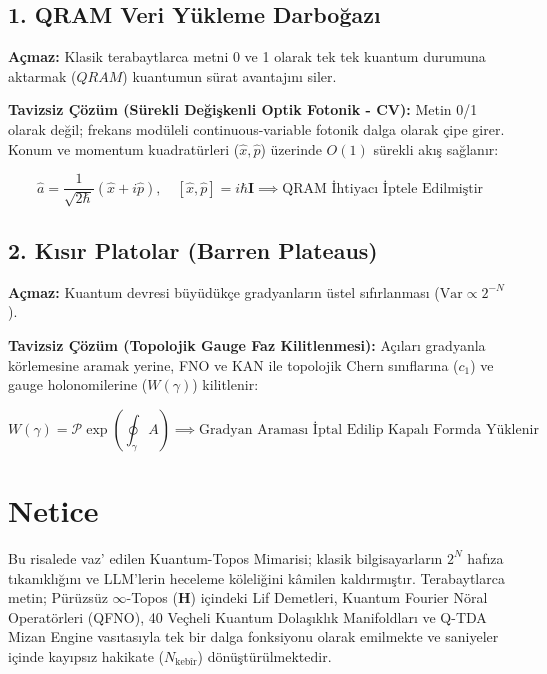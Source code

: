 \documentclass[11pt, a4paper]{article}
\begin{document}
\subsection{1. QRAM Veri Yükleme Darboğazı}
\textbf{Açmaz:} Klasik terabaytlarca metni 0 ve 1 olarak tek tek kuantum durumuna aktarmak ($QRAM$) kuantumun sürat avantajını siler.

\textbf{Tavizsiz Çözüm (Sürekli Değişkenli Optik Fotonik - CV):} Metin 0/1 olarak değil; frekans modüleli continuous-variable fotonik dalga olarak çipe girer. Konum ve momentum kuadratürleri ($\hat{x}, \hat{p}$) üzerinde $O(1)$ sürekli akış sağlanır:

\begin{equation}
\hat{a} = \frac{1}{\sqrt{2\hbar}}(\hat{x} + i\hat{p}), \quad [\hat{x}, \hat{p}] = i\hbar \mathbf{I} \implies \text{QRAM İhtiyacı İptele Edilmiştir}
\end{equation}

\subsection{2. Kısır Platolar (Barren Plateaus)}
\textbf{Açmaz:} Kuantum devresi büyüdükçe gradyanların üstel sıfırlanması ($\text{Var} \propto 2^{-N}$).

\textbf{Tavizsiz Çözüm (Topolojik Gauge Faz Kilitlenmesi):} Açıları gradyanla körlemesine aramak yerine, FNO ve KAN ile topolojik Chern sınıflarına ($c_1$) ve gauge holonomilerine ($W(\gamma)$) kilitlenir:

\begin{equation}
W(\gamma) = \mathcal{P} \exp\left( \oint_\gamma A \right) \implies \text{Gradyan Araması İptal Edilip Kapalı Formda Yüklenir}
\end{equation}

\section{Netice}

Bu risalede vaz' edilen Kuantum-Topos Mimarisi; klasik bilgisayarların $2^N$ hafıza tıkanıklığını ve LLM'lerin heceleme köleliğini kâmilen kaldırmıştır. Terabaytlarca metin; Pürüzsüz $\infty$-Topos ($\mathbf{H}$) içindeki Lif Demetleri, Kuantum Fourier Nöral Operatörleri (QFNO), 40 Veçheli Kuantum Dolaşıklık Manifoldları ve Q-TDA Mizan Engine vasıtasıyla tek bir dalga fonksiyonu olarak emilmekte ve saniyeler içinde kayıpsız hakikate ($N_{\text{kebîr}}$) dönüştürülmektedir.
\end{document}
